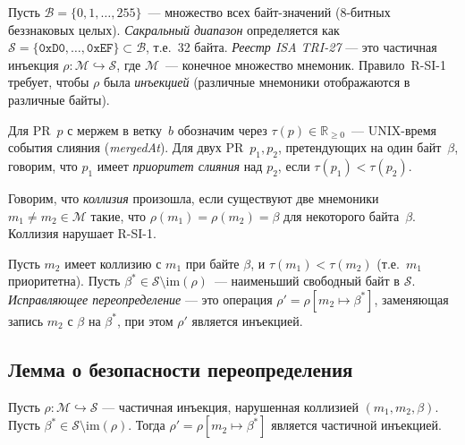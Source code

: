 
\begin{definition}
\label{def:opcode_space}
Пусть $\mathcal{B} = \{0, 1, \ldots, 255\}$~— множество всех байт-значений
(8-битных беззнаковых целых).  \emph{Сакральный диапазон} определяется как
$\mathcal{S} = \{\mathtt{0xD0}, \ldots, \mathtt{0xEF}\} \subset \mathcal{B}$,
т.е.\ 32 байта.  \emph{Реестр ISA TRI-27} — это частичная инъекция
$\rho : \mathcal{M} \hookrightarrow \mathcal{S}$, где $\mathcal{M}$~— конечное
множество мнемоник.  Правило~R-SI-1 требует, чтобы $\rho$ была \emph{инъекцией}
(различные мнемоники отображаются в различные байты).
\end{definition}

\begin{definition}
\label{def:merge_timestamp}
Для PR~$p$ с мержем в ветку~$b$ обозначим через
$\tau(p) \in \mathbb{R}_{\geq 0}$~— UNIX-время события слияния
(\textit{mergedAt}).  Для двух PR~$p_1, p_2$, претендующих на один
байт~$\beta$, говорим, что $p_1$ имеет \emph{приоритет слияния} над $p_2$,
если $\tau(p_1) < \tau(p_2)$.
\end{definition}

\begin{definition}
\label{def:opcode_collision}
Говорим, что \emph{коллизия} произошла, если существуют две мнемоники
$m_1 \neq m_2 \in \mathcal{M}$ такие, что $\rho(m_1) = \rho(m_2) = \beta$
для некоторого байта~$\beta$.  Коллизия нарушает R-SI-1.
\end{definition}

\begin{definition}
\label{def:corrective_reassign}
Пусть $m_2$ имеет коллизию с $m_1$ при байте $\beta$,
и $\tau(m_1) < \tau(m_2)$ (т.е.\ $m_1$ приоритетна).
Пусть $\beta^* \in \mathcal{S} \setminus \mathrm{im}(\rho)$~— наименьший
свободный байт в $\mathcal{S}$.
\emph{Исправляющее переопределение} — это операция
$\rho' = \rho[m_2 \mapsto \beta^*]$, заменяющая запись $m_2$
с $\beta$ на $\beta^*$, при этом $\rho'$ является инъекцией.
\end{definition}

\subsection{Лемма о безопасности переопределения}

\begin{lemma}
\label{lem:injectivity_after_fix}
Пусть $\rho : \mathcal{M} \hookrightarrow \mathcal{S}$ — частичная
инъекция, нарушенная коллизией $(m_1, m_2, \beta)$.  Пусть
$\beta^* \in \mathcal{S} \setminus \mathrm{im}(\rho)$.
Тогда $\rho' = \rho[m_2 \mapsto \beta^*]$ является частичной инъекцией.
\end{lemma}

